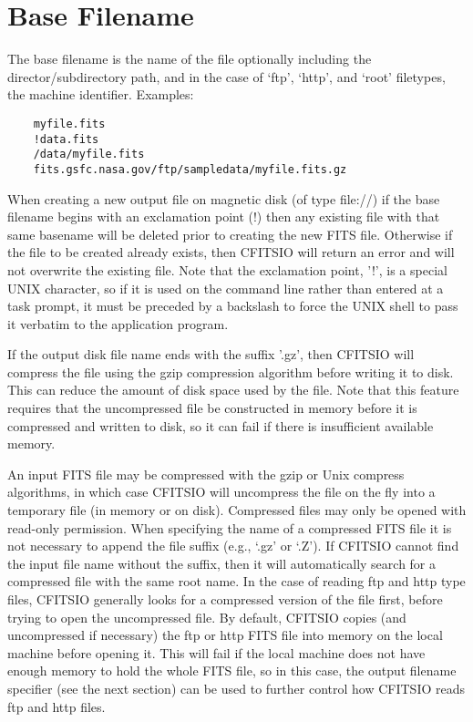 \documentclass[11pt]{book}
\begin{document}
\section{Base Filename}

The base filename is the name of the file optionally including the
director/subdirectory path, and in the case of `ftp', `http', and `root'
filetypes, the machine identifier.  Examples:

\begin{verbatim}
    myfile.fits
    !data.fits
    /data/myfile.fits
    fits.gsfc.nasa.gov/ftp/sampledata/myfile.fits.gz
\end{verbatim}

When creating a new output file on magnetic disk (of type file://) if
the base filename begins with an exclamation point (!) then any
existing file with that same basename will be deleted prior to creating
the new FITS file.  Otherwise if the file to be created already exists,
then CFITSIO will return an error and will not overwrite the existing
file.  Note  that the exclamation point,  '!', is a special UNIX character,
so if it is used  on the command line rather than entered at a task
prompt, it must be  preceded by a backslash to force the UNIX
shell to pass it verbatim to the application program.

If the output disk file name ends with the suffix '.gz', then CFITSIO
will compress the file using the gzip compression algorithm before
writing it to disk.  This can reduce the amount of disk space used by
the file.  Note that this feature requires that the uncompressed file
be constructed in memory before it is compressed and written to disk,
so it can fail if there is insufficient available memory.

An input FITS file may be compressed with the gzip or Unix compress
algorithms, in which case CFITSIO will uncompress the file on the fly
into a temporary file (in memory or on disk).  Compressed files may
only be opened with read-only permission.  When specifying the name of
a compressed FITS file it is not necessary to append the file suffix
(e.g., `.gz' or `.Z').  If CFITSIO cannot find the input file name
without the suffix, then it will automatically search for a compressed
file with the same root name.  In the case of reading ftp and http type
files, CFITSIO generally looks for a compressed version of the file
first, before trying to open the uncompressed file.  By default,
CFITSIO copies (and uncompressed if necessary) the ftp or http FITS
file into memory on the local machine before opening it.  This will
fail if the local machine does not have enough memory to hold the whole
FITS file, so in this case, the output filename specifier (see the next
section) can be used to further control how CFITSIO reads ftp and http
files.
\end{document}
